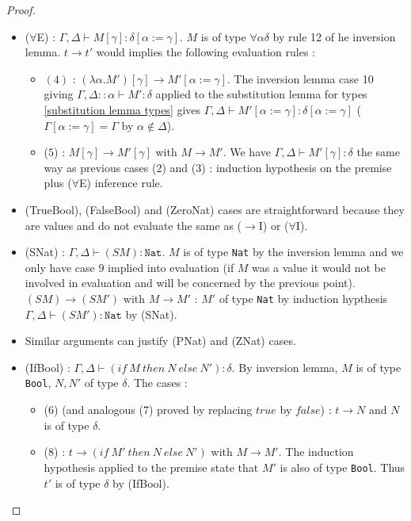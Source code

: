 \documentclass{article}
\begin{document}
\begin{proof}
\begin{itemize}
            \item ($\forall$E) : $\Gamma,\Delta\vdash M [\gamma] : \delta[\alpha:=\gamma]$. $M$ is of type $\forall \alpha \delta$ by rule 12 of he inversion lemma. $t\rightarrow t'$ would implies the following evaluation rules :
            \begin{itemize}
                \item $(4)$ : $(\lambda \alpha.M') [\gamma]\rightarrow M'[\alpha:=\gamma]$. The inversion lemma case 10 giving $\Gamma, \Delta::\alpha\vdash M' : \delta$ applied to the substitution lemma for types \ref{substitution lemma types} gives $\Gamma,\Delta\vdash M'[\alpha:=\gamma] : \delta[\alpha:=\gamma]$ ($\Gamma[\alpha:=\gamma] = \Gamma$ by $\alpha\not\in\Delta$).

                \item ($5$) : $M[\gamma] \rightarrow M'[\gamma]$ with $M \rightarrow M'$. We have $\Gamma,\Delta\vdash M'[\gamma] : \delta$ the same way as previous cases ($2$) and ($3$) : induction hypothesis on the premise plus ($\forall$E) inference rule.
            \end{itemize}

            \item (TrueBool), (FalseBool) and (ZeroNat) cases are straightforward because they are values and do not evaluate the same as ($\rightarrow$I) or ($\forall$I).

            \item (SNat) : $\Gamma,\Delta\vdash (S M) : \texttt{Nat}$. $M$ is of type \texttt{Nat} by the inversion lemma and we only have case $9$ implied into evaluation (if $M$ was a value it would not be involved in evaluation and will be concerned by the previous point).  $(S M)\rightarrow (S M') $ with $M \rightarrow M'$ : $M'$ of type \texttt{Nat} by induction hypthesis $\Gamma,\Delta\vdash (S M') : \texttt{Nat}$ by (SNat).

            \item Similar arguments can justify (PNat) and (ZNat) cases.

            \item (IfBool) : $\Gamma,\Delta\vdash (if \ M \ then \ N \ else \ N') : \delta$. By inversion lemma, $M$ is of type \texttt{Bool}, $N,N'$ of type $\delta$. The cases :
            \begin{itemize}
                \item (6) (and analogous (7) proved by replacing $true$ by $false$) : $t \rightarrow N$ and $N$ is of type $\delta$.
                
                \item (8) : $t \rightarrow (if \ M' \ then \ N \ else \ N')$ with $M\rightarrow M'$. The induction hypothesis applied to the premise state that $M'$ is also of type \texttt{Bool}. Thus $t'$ is of type $\delta$ by (IfBool).
            \end{itemize}
        \end{itemize}
    \end{proof}
\end{document}
